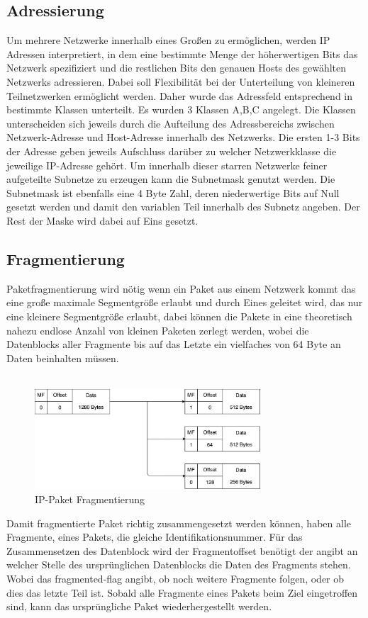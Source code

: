 \subsection{Adressierung}
Um mehrere Netzwerke innerhalb eines Großen zu ermöglichen, werden IP Adressen interpretiert, in dem eine bestimmte Menge der höherwertigen Bits das Netzwerk spezifiziert und die restlichen Bits den genauen Hosts des gewählten Netzwerks adressieren. Dabei soll Flexibilität bei der Unterteilung von kleineren Teilnetzwerken ermöglicht werden. Daher wurde das Adressfeld entsprechend in bestimmte Klassen unterteilt. Es wurden 3 Klassen A,B,C angelegt. Die Klassen unterscheiden sich jeweils durch die Aufteilung des Adressbereichs zwischen Netzwerk-Adresse und Host-Adresse innerhalb des Netzwerks. Die ersten 1-3 Bits der Adresse geben jeweils Aufschluss darüber zu welcher Netzwerkklasse die jeweilige IP-Adresse gehört. Um innerhalb dieser starren Netzwerke feiner aufgeteilte Subnetze zu erzeugen kann die Subnetmask genutzt werden. Die Subnetmask ist ebenfalls eine 4 Byte Zahl, deren niederwertige Bits auf Null gesetzt werden und damit den variablen Teil innerhalb des Subnetz angeben. Der Rest der Maske wird dabei auf Eins gesetzt.


\subsection{Fragmentierung}

Paketfragmentierung wird nötig wenn ein Paket aus einem Netzwerk kommt das eine große maximale Segmentgröße erlaubt und durch Eines geleitet wird, das nur eine kleinere Segmentgröße erlaubt, dabei können die Pakete in eine theoretisch nahezu endlose Anzahl von kleinen Paketen zerlegt werden, wobei die Datenblocks aller Fragmente bis auf das Letzte ein vielfaches von 64 Byte an Daten beinhalten müssen.\\\\
\begin{figure}[htp]
	\centering
	\includegraphics[width=0.75\textwidth]{Graphics/IPfragmentation.png}
	\caption{IP-Paket Fragmentierung}
\end{figure}
Damit fragmentierte Paket richtig zusammengesetzt werden können, haben alle Fragmente, eines Pakets, die gleiche Identifikationsnummer. Für das Zusammensetzen des Datenblock wird der Fragmentoffset benötigt der angibt an welcher Stelle des ursprünglichen Datenblocks die Daten des Fragments stehen. Wobei das fragmented-flag angibt, ob noch weitere Fragmente folgen, oder ob dies das letzte Teil ist. Sobald alle Fragmente eines Pakets beim Ziel eingetroffen sind, kann das ursprüngliche Paket wiederhergestellt werden. 

